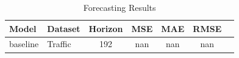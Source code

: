 \begin{table}[h]
\centering
\caption{Forecasting Results}
\begin{tabular}{llccccc}
\toprule
Model & Dataset & Horizon & MSE & MAE & RMSE \\
\midrule
baseline & Traffic & 192 & nan & nan & nan \\
\bottomrule
\end{tabular}
\end{table}